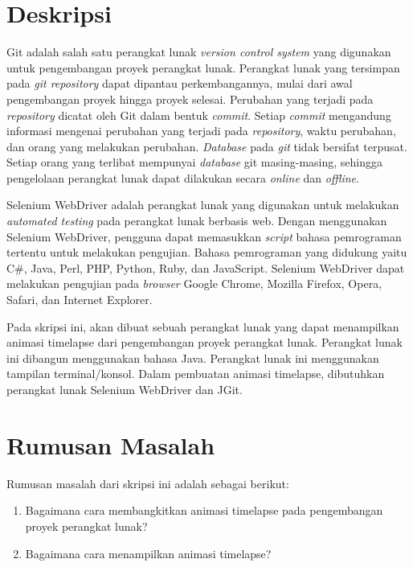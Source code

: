 \documentclass[a4paper,twoside]{article}
\begin{document}
\title{\@judultopik}
\author{\nama \textendash \@npm} 

\newcommand{\nama}{Billy Adiwijaya}
\newcommand{\@npm}{2015730053}
\newcommand{\@judultopik}{Pembangkit Timelapse Pengembangan Proyek Perangkat Lunak} %
\newcommand{\jumpemb}{1} %
\newcommand{\tanggal}{3/09/2018}
\maketitle


\section{Deskripsi}
	Git adalah salah satu perangkat lunak \textit{version control system} yang digunakan untuk pengembangan proyek perangkat lunak. Perangkat lunak yang tersimpan pada \textit{git repository} dapat dipantau perkembangannya, mulai dari awal pengembangan proyek hingga proyek selesai. Perubahan yang terjadi pada \textit{repository} dicatat oleh Git dalam bentuk \textit{commit}. Setiap \textit{commit} mengandung informasi mengenai perubahan yang terjadi pada \textit{repository}, waktu perubahan, dan orang yang melakukan perubahan. \textit{Database} pada \textit{git} tidak bersifat terpusat. Setiap orang yang terlibat mempunyai \textit{database} git masing-masing, sehingga pengelolaan perangkat lunak dapat dilakukan secara \textit{online} dan \textit{offline}. 

Selenium WebDriver adalah perangkat lunak yang digunakan untuk melakukan \textit{automated testing} pada perangkat lunak berbasis web. Dengan menggunakan Selenium WebDriver, pengguna dapat memasukkan \textit{script} bahasa pemrograman tertentu untuk melakukan pengujian. Bahasa pemrograman yang didukung yaitu C\#, Java, Perl, PHP, Python, Ruby, dan JavaScript. Selenium WebDriver dapat melakukan pengujian pada \textit{browser} Google Chrome, Mozilla Firefox, Opera, Safari, dan Internet Explorer.  
  
Pada skripsi ini, akan dibuat sebuah perangkat lunak yang dapat menampilkan animasi timelapse dari pengembangan proyek perangkat lunak. Perangkat lunak ini dibangun menggunakan bahasa Java. Perangkat lunak ini menggunakan tampilan terminal/konsol. Dalam pembuatan animasi timelapse, dibutuhkan perangkat lunak Selenium WebDriver dan JGit.
 

\section{Rumusan Masalah}
Rumusan masalah dari skripsi ini adalah sebagai berikut:
\begin{enumerate}
	\item Bagaimana cara membangkitkan animasi timelapse pada pengembangan proyek perangkat lunak?
	\item Bagaimana cara menampilkan animasi timelapse?
\end{enumerate}
\end{document}

